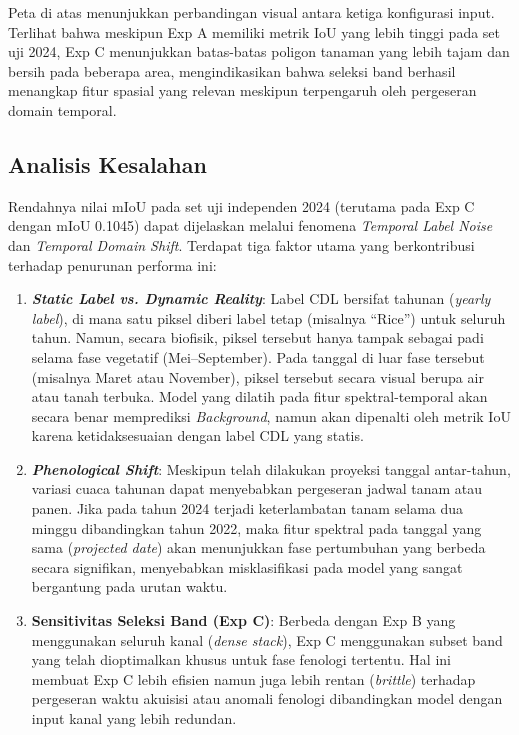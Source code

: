 Peta di atas menunjukkan perbandingan visual antara ketiga konfigurasi input. Terlihat bahwa meskipun Exp A memiliki metrik IoU yang lebih tinggi pada set uji 2024, Exp C menunjukkan batas-batas poligon tanaman yang lebih tajam dan bersih pada beberapa area, mengindikasikan bahwa seleksi band berhasil menangkap fitur spasial yang relevan meskipun terpengaruh oleh pergeseran domain temporal.

\subsection{Analisis Kesalahan}

Rendahnya nilai mIoU pada set uji independen 2024 (terutama pada Exp C dengan mIoU 0.1045) 
dapat dijelaskan melalui fenomena \textit{Temporal Label Noise} dan \textit{Temporal Domain Shift}. 
Terdapat tiga faktor utama yang berkontribusi terhadap penurunan performa ini:

\begin{enumerate}
    \item \textbf{\textit{Static Label vs. Dynamic Reality}}: Label CDL bersifat tahunan 
    (\textit{yearly label}), di mana satu piksel diberi label tetap (misalnya ``Rice'') 
    untuk seluruh tahun. Namun, secara biofisik, piksel tersebut hanya tampak sebagai padi 
    selama fase vegetatif (Mei--September). Pada tanggal di luar fase tersebut (misalnya 
    Maret atau November), piksel tersebut secara visual berupa air atau tanah terbuka. 
    Model yang dilatih pada fitur spektral-temporal akan secara benar memprediksi 
    \textit{Background}, namun akan dipenalti oleh metrik IoU karena ketidaksesuaian 
    dengan label CDL yang statis.
    
    \item \textbf{\textit{Phenological Shift}}: Meskipun telah dilakukan proyeksi tanggal 
    antar-tahun, variasi cuaca tahunan dapat menyebabkan pergeseran jadwal tanam atau 
    panen. Jika pada tahun 2024 terjadi keterlambatan tanam selama dua minggu dibandingkan 
    tahun 2022, maka fitur spektral pada tanggal yang sama (\textit{projected date}) 
    akan menunjukkan fase pertumbuhan yang berbeda secara signifikan, menyebabkan 
    misklasifikasi pada model yang sangat bergantung pada urutan waktu.
    
    \item \textbf{Sensitivitas Seleksi Band (Exp C)}: Berbeda dengan Exp B yang menggunakan 
    seluruh kanal (\textit{dense stack}), Exp C menggunakan subset band yang telah 
    dioptimalkan khusus untuk fase fenologi tertentu. Hal ini membuat Exp C lebih 
    efisien namun juga lebih rentan (\textit{brittle}) terhadap pergeseran waktu 
    akuisisi atau anomali fenologi dibandingkan model dengan input kanal yang lebih redundan.
\end{enumerate}


